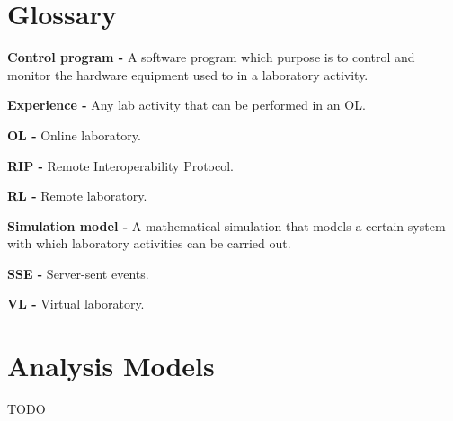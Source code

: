 \begin{appendices}

\chapter{Glossary}
\textbf{Control program -} A software program which purpose is to control and monitor the hardware equipment used to in a laboratory activity.

\textbf{Experience -} Any lab activity that can be performed in an OL.

\textbf{OL -} Online laboratory.

\textbf{RIP -} Remote Interoperability Protocol.

\textbf{RL -} Remote laboratory.

\textbf{Simulation model -} A mathematical simulation that models a certain system with which laboratory activities can be carried out.

\textbf{SSE -} Server-sent events.

\textbf{VL -} Virtual laboratory.


\chapter{Analysis Models}
TODO

\end{appendices}


\renewcommand\bibname{References}
